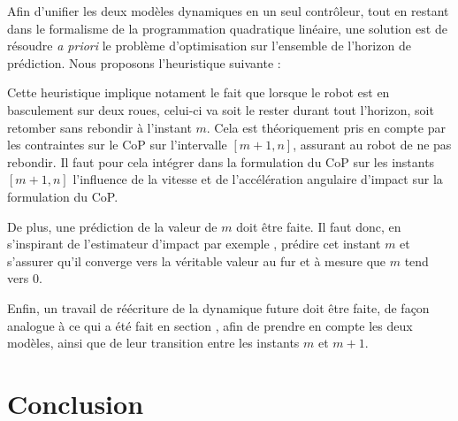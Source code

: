		Afin d'unifier les deux modèles dynamiques en un seul contrôleur, tout en restant dans le formalisme de la programmation quadratique linéaire, 
		une solution est de résoudre \textit{a priori} le problème d'optimisation sur l'ensemble de l'horizon de prédiction.
		Nous proposons l'heuristique suivante :
		
		Cette heuristique implique notament le fait que lorsque le robot est en basculement sur deux roues, celui-ci va soit le rester durant tout l'horizon, soit retomber sans rebondir à l'instant $m$. 
		Cela est théoriquement pris en compte par les contraintes sur le CoP sur l'intervalle $[m+1, n]$, assurant au robot de ne pas rebondir.
		Il faut pour cela intégrer dans la formulation du CoP sur les instants $[m+1, n]$ l'influence de la vitesse et de l'accélération angulaire d'impact sur la formulation du CoP.
		
		De plus, une prédiction de la valeur de $m$ doit être faite. 
		Il faut donc, en s'inspirant de l'estimateur d'impact par exemple , prédire cet instant $m$ et s'assurer qu'il converge vers la véritable valeur au fur et à mesure que $m$ tend vers $0$.
		
		Enfin, un travail de réécriture de la dynamique future doit être faite, de façon analogue à ce qui a été fait en section , afin de prendre en compte les deux modèles, ainsi que de leur transition entre les instants $m$ et $m+1$.
		
		
	\section{Conclusion}
	
